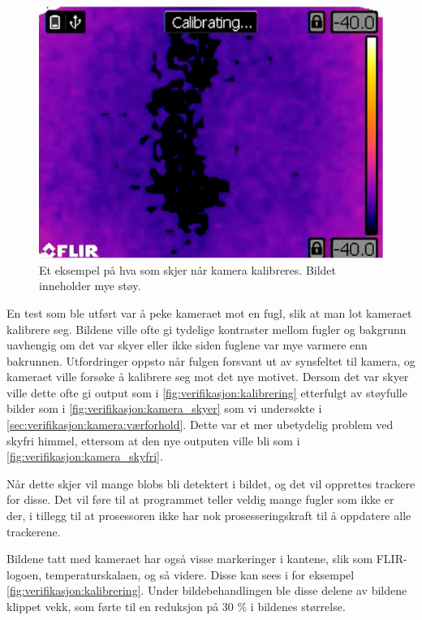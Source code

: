 \begin{figure}
    \centering
    \includegraphics[width=.42\textwidth]{verifikasjon-test/Kamera/kalibrering.jpg}
    \caption{Et eksempel på hva som skjer når kamera kalibreres. Bildet inneholder mye støy.}
    \label{fig:verifikasjon:kalibrering}
\end{figure}

En test som ble utført var å peke kameraet mot en fugl, slik at man lot kameraet kalibrere seg. 
Bildene ville ofte gi tydelige kontraster mellom fugler og bakgrunn uavhengig om det var skyer eller ikke siden fuglene var mye varmere enn bakrunnen. 
Utfordringer oppsto når fulgen forsvant ut av synsfeltet til kamera, og kameraet ville forsøke å kalibrere seg mot det nye motivet. 
Dersom det var skyer ville dette ofte gi output som i \autoref{fig:verifikasjon:kalibrering} etterfulgt av støyfulle bilder som i \autoref{fig:verifikasjon:kamera_skyer} som vi undersøkte i \autoref{sec:verifikasjon:kamera:værforhold}. 
Dette var et mer ubetydelig problem ved skyfri himmel, ettersom at den nye outputen ville bli som i \autoref{fig:verifikasjon:kamera_skyfri}.



Når dette skjer vil mange blobs bli detektert i bildet, og det vil opprettes trackere for disse. 
Det vil føre til at programmet teller veldig mange fugler som ikke er der, i tillegg til at prosessoren ikke har nok prosesseringskraft til å oppdatere alle trackerene. 

Bildene tatt med kameraet har også visse markeringer i kantene, slik som FLIR-logoen, temperaturskalaen, og så videre. Disse kan sees i for eksempel \autoref{fig:verifikasjon:kalibrering}. Under bildebehandlingen ble disse delene av bildene klippet vekk, som førte til en reduksjon på 30 \% i bildenes størrelse.



